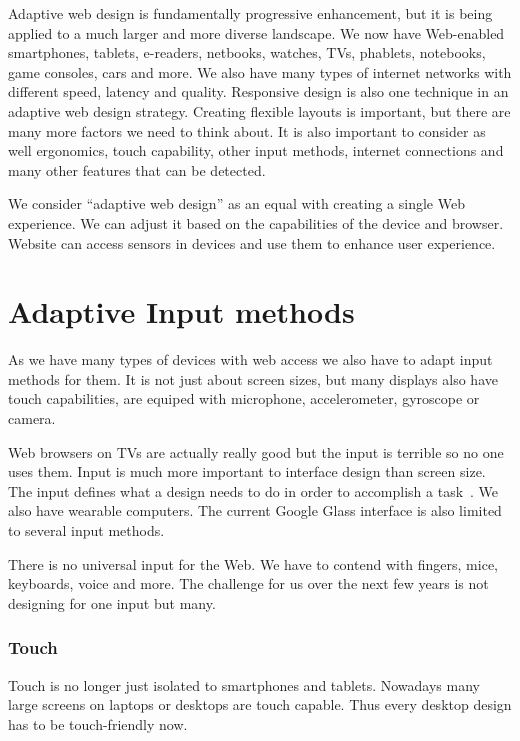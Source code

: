 \documentclass{iitsrc}
\begin{document}
Adaptive web design is fundamentally progressive enhancement, but it is being applied to a much larger and more diverse landscape. We now have Web-enabled smartphones, tablets, e-readers, netbooks, watches, TVs, phablets, notebooks, game consoles, cars and more. We also have many types of internet networks with different speed, latency and quality. Responsive design is also one technique in an adaptive web design strategy. Creating flexible layouts is important, but there are many more factors we need to think about. It is also important to consider as well ergonomics, touch capability, other input methods, internet connections and many other features that can be detected.

We consider ``adaptive web design'' as an equal with creating a single Web experience. We can adjust it based on the capabilities of the device and browser. Website can access sensors in devices and use them to enhance user experience.


\section{Adaptive Input methods}

As we have many types of devices with web access we also have to adapt input methods for them. It is not just about screen sizes, but many displays also have touch capabilities, are equiped with microphone, accelerometer, gyroscope or camera.

Web browsers on TVs are actually really good but the input is terrible so no one uses them. Input is much more important to interface design than screen size. The input defines what a design needs to do in order to accomplish a task~\cite{adaptiveinput}. We also have wearable computers. The current Google Glass interface is also limited to several input methods.

There is no universal input for the Web. We have to contend with fingers, mice, keyboards, voice and more. The challenge for us over the next few years is not designing for one input but many.

\subsubsection*{Touch} %
\label{sub:touch}

Touch is no longer just isolated to smartphones and tablets. Nowadays many large screens on laptops or desktops are touch capable. Thus every desktop design has to be touch-friendly now.
\end{document}
